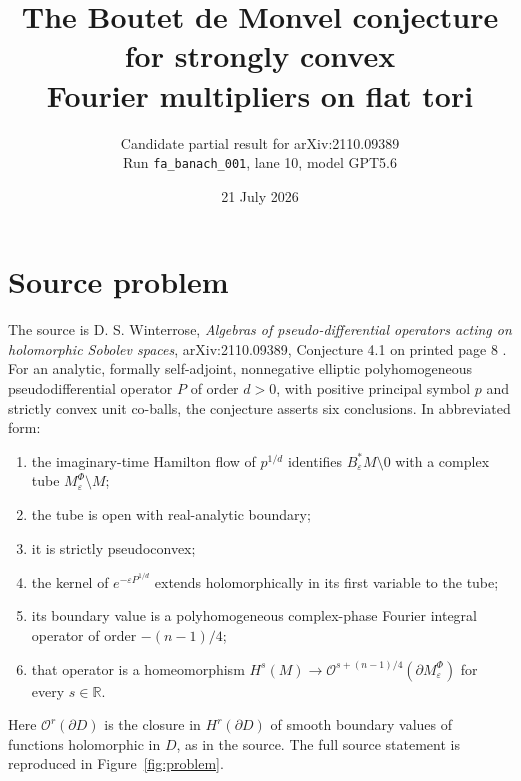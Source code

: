 \documentclass[11pt]{article}
\title{The Boutet de Monvel conjecture for strongly convex\\
Fourier multipliers on flat tori}
\author{Candidate partial result for arXiv:2110.09389\\
Run \texttt{fa\_banach\_001}, lane 10, model GPT5.6}
\date{21 July 2026}
\theoremstyle{remark}
\newcommand{\R}{\mathbb R}
\newcommand{\eps}{\varepsilon}
\newcommand{\cO}{\mathcal O}
\begin{document}
\maketitle

\begin{center}
\end{center}

\section{Source problem}

The source is D. S. Winterrose, \emph{Algebras of pseudo-differential
operators acting on holomorphic Sobolev spaces}, arXiv:2110.09389,
Conjecture 4.1 on printed page 8 \cite{Winterrose}.  For an analytic, formally
self-adjoint, nonnegative elliptic polyhomogeneous pseudodifferential operator
$P$ of order $d>0$, with positive principal symbol $p$ and strictly convex
unit co-balls, the conjecture asserts six conclusions.  In abbreviated form:

\begin{enumerate}[label=(\arabic*)]
\item the imaginary-time Hamilton flow of $p^{1/d}$ identifies
      $B^*_{\eps}M\setminus0$ with a complex tube
      $M^\Phi_\eps\setminus M$;
\item the tube is open with real-analytic boundary;
\item it is strictly pseudoconvex;
\item the kernel of $e^{-\eps P^{1/d}}$ extends holomorphically in its first
      variable to the tube;
\item its boundary value is a polyhomogeneous complex-phase Fourier integral
      operator of order $-(n-1)/4$;
\item that operator is a homeomorphism
      $H^s(M)\to\cO^{s+(n-1)/4}(\partial M^\Phi_\eps)$ for every $s\in\R$.
\end{enumerate}

Here $\cO^r(\partial D)$ is the closure in $H^r(\partial D)$ of smooth
boundary values of functions holomorphic in $D$, as in the source.  The full
source statement is reproduced in Figure~\ref{fig:problem}.
\end{document}

